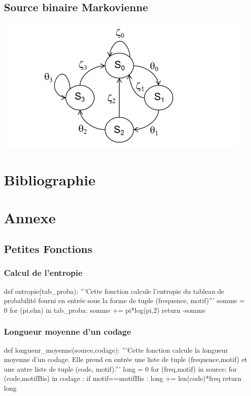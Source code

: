 \documentclass[a4paper,12pt,french]{article}
\begin{document}
	\subsection{Source binaire Markovienne}
	\includegraphics[scale=1]{SourceAvecMemoire.png}
	
\section{Bibliographie}
 	
\section{Annexe}	
	\subsection{Petites Fonctions}
		\subsubsection{Calcul de l'entropie}
		\begin{code}
		def entropie(tab_proba):
    '''Cette fonction calcule l'entropie du tableau de probabilité fourni en entrée sous la forme de tuple (frequence, motif)'''
    somme = 0
    for (pi,elm) in tab_proba:
        somme += pi*log(pi,2)
    return -somme
		\end{code}
		\subsubsection{Longueur moyenne d'un codage}
		\begin{code}
		def longueur_moyenne(source,codage):
    '''Cette fonction calcule la longueur moyenne d'un codage. Elle prend en entrée une liste de tuple (frequence,motif) et une autre liste de tuple (code, motif).'''
    long = 0
    for (freq,motif) in source:
        for (code,motifBis) in codage :
            if motif==motifBis :
                long += len(code)*freq
    return long
    \end{code}
\end{document}
